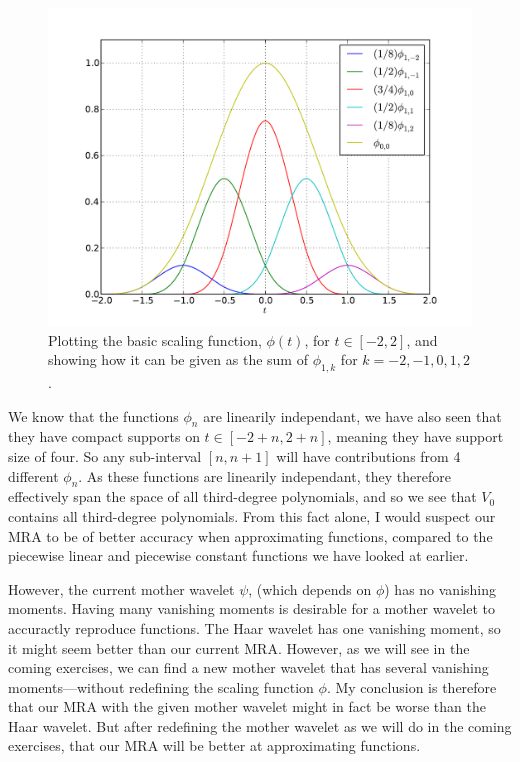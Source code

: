 \documentclass[a4paper, 11pt, notitlepage, english]{article}
\begin{document}
\begin{figure}[th]
\centering
\includegraphics[width=\textwidth]{scaling_functions.pdf}
\caption{Plotting the basic scaling function, $\phi(t)$, for $t\in[-2,2]$, and showing how it can be given as the sum of $\phi_{1,k}$ for $k=-2,-1,0,1,2$.}
\end{figure}


We know that the functions $\phi_n$ are linearily independant, we have also seen that they have compact supports on $t\in[-2+n,2+n]$, meaning they have support size of four. So any sub-interval $[n,n+1]$ will have contributions from 4 different $\phi_n$. As these functions are linearily independant, they therefore effectively span the space of all third-degree polynomials, and so we see that $V_0$ contains all third-degree polynomials. From this fact alone, I would suspect our MRA to be of better accuracy when approximating functions, compared to the piecewise linear and piecewise constant functions we have looked at earlier.

However, the current mother wavelet $\psi$, (which depends on $\phi$) has no vanishing moments. Having many vanishing moments is desirable for a mother wavelet to accuractly reproduce functions. The Haar wavelet has one vanishing moment, so it might seem better than our current MRA. However, as we will see in the coming exercises, we can find a new mother wavelet that has several vanishing moments---without redefining the scaling function $\phi$. My conclusion is therefore that our MRA with the given mother wavelet might in fact be worse than the Haar wavelet. But after redefining the mother wavelet as we will do in the coming exercises, that our MRA will be better at approximating functions.
\end{document}
